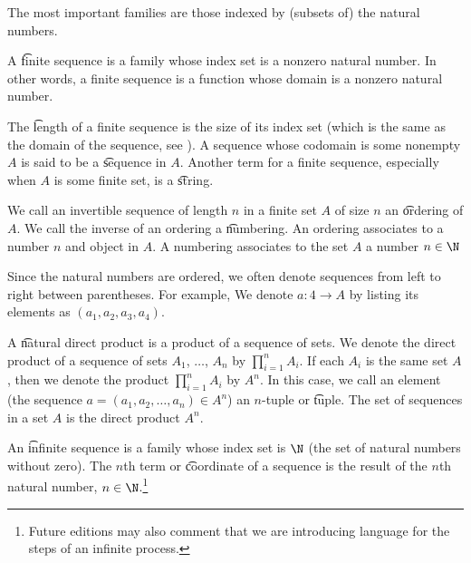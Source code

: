

The most important families are those indexed by (subsets of) the natural numbers.


A \t{finite sequence} is a family whose index set is a nonzero natural number.
In other words, a finite sequence is a function whose domain is a nonzero natural number.

The \t{length} of a finite sequence is the size of its index set (which is the same as the domain of the sequence, see ).
A sequence whose codomain is some nonempty $A$ is said to be a \t{sequence in} $A$.
Another term for a finite sequence, especially when $A$ is some finite set, is a \t{string}.

    We call an invertible sequence of length $n$ in a finite set $A$ of size $n$ an \t{ordering} of $A$.
We call the inverse of an ordering a \t{numbering}.
An ordering associates to a number $n$ and object in $A$.
A numbering associates to the set $A$ a number $n \in \N$


Since the natural numbers are ordered, we often denote sequences from left to right between parentheses.
For example, We denote $a: 4 \to A$ by listing its elements as $(a_1, a_2, a_3, a_4)$.


A \t{natural direct product} is a product of a sequence of sets.
We denote the direct product of a sequence of sets $A_1$, $\dots$, $A_n$ by $\prod_{i = 1}^{n} A_i$.
If each $A_i$ is the same set $A$, then we denote the product $\prod_{i = 1}^{n} A_i$ by $A^n$.
In this case, we call an element (the sequence $a = (a_1, a_2, \dots, a_n) \in A^n$) an \t{$n$-tuple} or \t{tuple}.
The set of sequences in a set $A$ is the direct product $A^n$.


An \t{infinite sequence} is a family whose index set is $\N$ (the set of natural numbers without zero).
The \t{$n$th term} or \t{coordinate} of a sequence is the result of the $n$th natural number, $n \in \N$.\footnote{Future editions may also comment that we are introducing language for the steps of an infinite process.}

